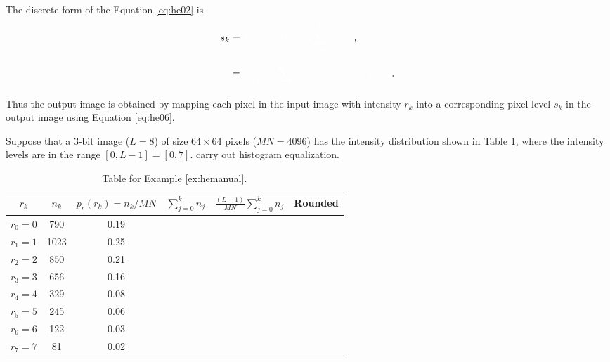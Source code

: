 \begin{frame}[allowframebreaks]
The discrete form of the Equation \ref{eq:he02} is
	\begin{equation}\label{eq:he06}
		\begin{split}
		s_k &= \fillblank{T(r_k) = (L-1) \sum_{j=0}^{k}p_r(r_j)},\\
		  &= \fillblank{\frac{(L-1)}{MN} \sum_{j=0}^{k}n_j \quad k = 0,1, \dots, L -1}.\\
		 \end{split}
	\end{equation}
	Thus the output image is obtained by mapping each pixel in the input image with intensity $r_k$ into a corresponding pixel level $s_k$ in the output image using Equation \ref{eq:he06}.
\end{frame}


\begin{frame}
	\begin{example}\label{ex:hemanual}
		Suppose that a 3-bit image ($L=8$) of size $64\times 64$ pixels ($MN=4096$) has the intensity distribution shown in Table \ref{ta:hemanual}, where the intensity levels are in the range $[0,L-1] = [0,7]$.  carry out histogram equalization.
	\end{example}
\end{frame}


\begin{frame}	
\begin{table}
	\centering
		\begin{tabular}{|c|c|c|c|c|c|}
		\hline
		$r_k$ & $n_k$ & $p_r(r_k) = n_k/MN$ & $\sum_{j=0}^k n_j$ & $\frac{(L-1)}{MN}\sum_{j=0}^k n_j$ & Rounded\\
		\hline		
        $r_0 = 0$ & 790 & 0.19 & & & \\
		\hline	
        $r_1 = 1$ & 1023 & 0.25 & & & \\
		\hline	
        $r_2 = 2$ & 850 & 0.21 & & & \\
		\hline	
        $r_3 = 3$ & 656 & 0.16 & & & \\
		\hline	
        $r_4 = 4$ & 329 & 0.08 & & & \\
		\hline	
        $r_5 = 5$ & 245 & 0.06 & & & \\
		\hline	
        $r_6 = 6$ & 122 & 0.03 & & & \\
		\hline	
        $r_7 = 7$ & 81 & 0.02 & & & \\
		\hline										
		\end{tabular}
	\caption{Table for Example \ref{ex:hemanual}.}
	\label{ta:hemanual}
\end{table}
\end{frame}



